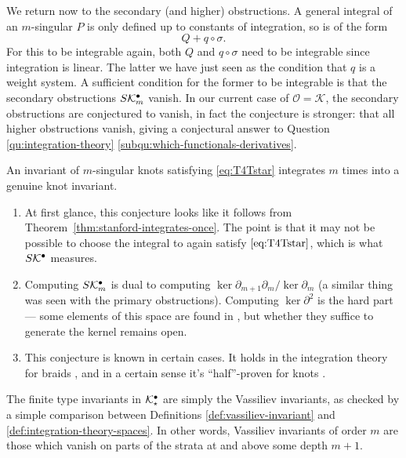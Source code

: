 We return now to the secondary (and higher) obstructions. A general integral of an \(m\)-singular \(P\) is only defined up to constants of integration, so is of the form
\[Q + q \circ \sigma.\]
For this to be integrable again, both \(Q\) and \(q \circ \sigma\) need to be integrable since integration is linear. The latter we have just seen as the condition that \(q\) is a weight system. A sufficient condition for the former to be integrable is that the secondary obstructions \(S\mathcal{K}^{\bullet}_{m}\) vanish. In our current case of \(\mathcal{O} = \mathcal{K}\), the secondary obstructions are conjectured to vanish, in fact the conjecture is stronger: that all higher obstructions vanish, giving a conjectural answer to Question \ref{qu:integration-theory} \ref{subqu:which-functionals-derivatives}.

\begin{conjecture}
	\label{conj:strong-fundamental-theorem}
	An invariant of \(m\)-singular knots satisfying \textup{\ref{eq:T4Tstar}} integrates \(m\) times into a genuine knot invariant.
\end{conjecture}

\begin{remarks}
	\begin{enumerate}
		\item At first glance, this conjecture looks like it follows from Theorem~\ref{thm:stanford-integrates-once}. The point is that it may not be possible to choose the integral to again satisfy \(\ref{eq:T4Tstar}\), which is what \(S\mathcal{K}^{\bullet}\) measures.
		\item Computing \(S\mathcal{K}^{\bullet}_{m}\) is dual to computing \(\ker \partial_{m + 1} \partial_{m} / \ker \partial_{m}\) (a similar thing was seen with the primary obstructions). Computing \(\ker \partial^{2}\) is the hard part --- some elements of this space are found in \cite{integration-of-singular-braid-invariants}, but whether they suffice to generate the kernel remains open.
		\item This conjecture is known in certain cases. It holds in the integration theory for braids \cite{integration-of-singular-braid-invariants}, and in a certain sense it's ``half''-proven for knots \cite{a-combinatorial-half-integration-from-weight-system-to-vassiliev-knot-invariant}.
	\end{enumerate}
\end{remarks}

The finite type invariants in \(\mathcal{K}^{\bullet}_{\star}\) are simply the Vassiliev invariants, as checked by a simple comparison between Definitions \ref{def:vassiliev-invariant} and \ref{def:integration-theory-spaces}. In other words, Vassiliev invariants of order \(m\) are those which vanish on parts of the strata at and above some depth \(m + 1\).

